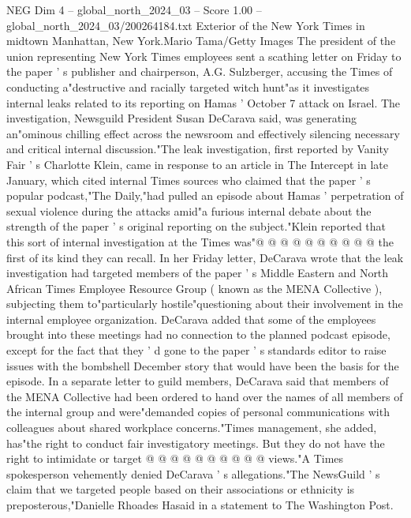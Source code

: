 \begin{textsample}{NEG Dim 4 – global\_north\_2024\_03 – Score 1.00 – global\_north\_2024\_03/200264184.txt}  \label{ex:f4_neg_224}
Exterior of the New York Times in midtown Manhattan, New York.Mario Tama/Getty Images The president of the union representing New York Times employees sent a scathing letter on Friday to the paper ' s publisher and chairperson, A.G.
Sulzberger, accusing the Times of conducting a"destructive and racially targeted witch hunt"as it investigates internal leaks related to its reporting on Hamas ' October 7 attack on Israel.
The investigation, Newsguild President Susan DeCarava said, was generating an"ominous chilling effect across the newsroom and effectively silencing necessary and critical internal discussion."The leak investigation, first reported by Vanity Fair ' s Charlotte Klein, came in response to an article in The Intercept in late January, which cited internal Times sources who claimed that the paper ' s popular podcast,"The Daily,"had pulled an episode about Hamas ' perpetration of sexual violence during the attacks amid"a furious internal debate about the strength of the paper ' s original reporting on the subject."Klein reported that this sort of internal investigation at the Times was"@ @ @ @ @ @ @ @ @ @ the first of its kind they can recall.
In her Friday letter, DeCarava wrote that the leak investigation had targeted members of the paper ' s Middle Eastern and North African Times Employee Resource Group ( known as the MENA Collective ), subjecting them to"particularly hostile"questioning about their involvement in the internal employee organization.
DeCarava added that some of the employees brought into these meetings had no connection to the planned podcast episode, except for the fact that they ' d gone to the paper ' s standards editor to raise issues with the bombshell December story that would have been the basis for the episode.
In a separate letter to guild members, DeCarava said that members of the MENA Collective had been ordered to hand over the names of all members of the internal group and were"demanded copies of personal communications with colleagues about shared workplace concerns."Times management, she added, has"the right to conduct fair investigatory meetings.
But they do not have the right to intimidate or target @ @ @ @ @ @ @ @ @ @ views."A Times spokesperson vehemently denied DeCarava ' s allegations."The NewsGuild ' s claim that we targeted people based on their associations or ethnicity is preposterous,"Danielle Rhoades Hasaid in a statement to The Washington Post.

\end{textsample}

